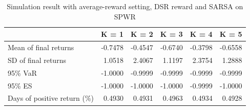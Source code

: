 \documentclass{article}
\begin{document}
\begin{table}[H]
\centering
\begin{tabular}{|l|r|r|r|r|r|} 
\hline
                             & \multicolumn{1}{l|}{K = 1} & \multicolumn{1}{l|}{K = 2} & \multicolumn{1}{l|}{K = 3} & \multicolumn{1}{l|}{K = 4} & \multicolumn{1}{l|}{K = 5}  \\ 
\hline
Mean of final returns        & -0.7478                    & -0.4547                    & -0.6740                    & -0.3798                    & -0.6558                     \\ 
\hline
SD of final returns          & 1.0518                     & 2.4067                     & 1.1197                     & 2.3754                     & 1.2888                      \\ 
\hline
95\% VaR                     & -1.0000                    & -0.9999                    & -0.9999                    & -0.9999                    & -0.9999                     \\ 
\hline
95\% ES                      & -1.0000                    & -1.0000                    & -1.0000                    & -0.9999                    & -1.0000                     \\ 
\hline
Days of positive return (\%) & 0.4930                     & 0.4931                     & 0.4963                     & 0.4934                     & 0.4928                      \\
\hline
\end{tabular}
\caption{Simulation result with average-reward setting, DSR reward and SARSA on SPWR}
\label{table15}
\end{table}
\end{document}
